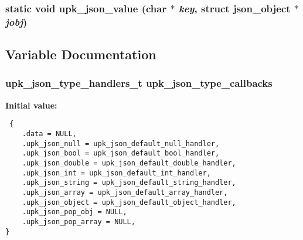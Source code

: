 \subsubsection{\setlength{\rightskip}{0pt plus 5cm}static void upk\_\-json\_\-value (char $\ast$ {\em key}, struct json\_\-object $\ast$ {\em jobj})\hspace{0.3cm}{\tt  [inline, static]}}\label{upk__json_8c_7c248650d514d85805db1ed609c02761}




\subsection{Variable Documentation}
\subsubsection{\setlength{\rightskip}{0pt plus 5cm}\bf{upk\_\-json\_\-type\_\-handlers\_\-t} \bf{upk\_\-json\_\-type\_\-callbacks}}\label{upk__json_8c_13031608a5ee069cf88bdb5206a8de6f}


\textbf{Initial value:}

\begin{Code}\begin{verbatim} {
    .data = NULL,
    .upk_json_null = upk_json_default_null_handler,
    .upk_json_bool = upk_json_default_bool_handler,
    .upk_json_double = upk_json_default_double_handler,
    .upk_json_int = upk_json_default_int_handler,
    .upk_json_string = upk_json_default_string_handler,
    .upk_json_array = upk_json_default_array_handler,
    .upk_json_object = upk_json_default_object_handler,
    .upk_json_pop_obj = NULL,
    .upk_json_pop_array = NULL,
}
\end{verbatim}\end{Code}

